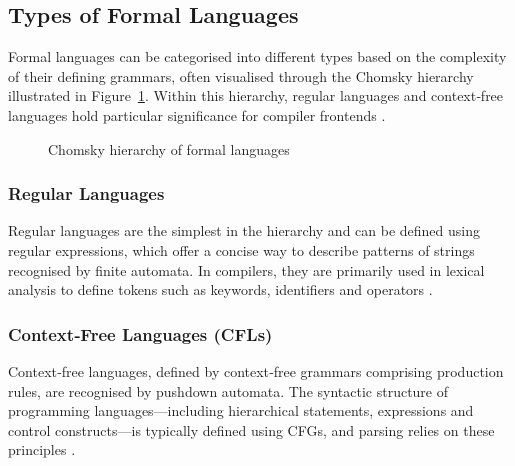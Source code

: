 \subsection{Types of Formal Languages}

Formal languages can be categorised into different types based on the complexity of their defining grammars, often visualised through the Chomsky hierarchy illustrated in Figure~\ref{figure:chomsky}. Within this hierarchy, regular languages and context‑free languages hold particular significance for compiler frontends \cite{aho2007compilers}.

\begin{figure}[ht]
\centering
{}
\caption{Chomsky hierarchy of formal languages}
\label{figure:chomsky}
\end{figure}

\subsubsection*{Regular Languages}
Regular languages are the simplest in the hierarchy and can be defined using regular expressions, which offer a concise way to describe patterns of strings recognised by finite automata. In compilers, they are primarily used in lexical analysis to define tokens such as keywords, identifiers and operators \cite{aho2007compilers}.

\subsubsection*{Context‑Free Languages (CFLs)}
Context‑free languages, defined by context‑free grammars comprising production rules, are recognised by pushdown automata. The syntactic structure of programming languages—including hierarchical statements, expressions and control constructs—is typically defined using CFGs, and parsing relies on these principles \cite{kent-context-free-grammars-pda, aho2007compilers}.

